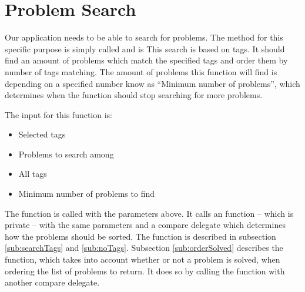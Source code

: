 \section{Problem Search}
\label{sec:search}
Our application needs to be able to search for problems.
The method for this specific purpose is simply called  and is 
This search is based on tags.
It should find an amount of problems which match the specified tags and order them by number of tags matching.
The amount of problems this function will find is depending on a specified number know as ``Minimum number of problems'', which determines when the function should stop searching for more problems.

The input for this function is:

\begin{itemize}
	\item Selected tags
	\item Problems to search among
	\item All tags
	\item Minimum number of problems to find
\end{itemize}

The  function is called with the parameters above. It calls an  function -- which is private -- with the same parameters and a compare delegate which determines how the problems should be sorted.
The  function is described in subsection \ref{sub:searchTags} and \ref{sub:noTags}.
Subsection \ref{sub:orderSolved} describes the  function, which takes into account whether or not a problem is solved, when ordering the list of problems to return.
It does so by calling the  function with another compare delegate.

